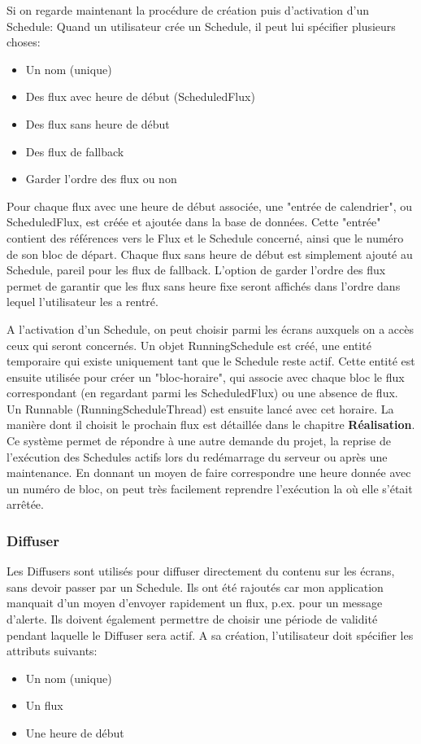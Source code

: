 \documentclass[french]{article}
\begin{document}
Si on regarde maintenant la procédure de création puis d'activation d'un Schedule:
Quand un utilisateur crée un Schedule, il peut lui spécifier plusieurs choses:
\begin{itemize}
	\item Un nom (unique)
	\item Des flux avec heure de début (ScheduledFlux)
	\item Des flux sans heure de début 
	\item Des flux de fallback
	\item Garder l'ordre des flux ou non
\end{itemize}

Pour chaque flux avec une heure de début associée, une "entrée de calendrier", ou ScheduledFlux, est créée et ajoutée dans la base de données. Cette "entrée" contient des références vers le Flux et le Schedule concerné, ainsi que le numéro de son bloc de départ.\newline
Chaque flux sans heure de début est simplement ajouté au Schedule, pareil pour les flux de fallback. L'option de garder l'ordre des flux permet de garantir que les flux sans heure fixe seront affichés dans l'ordre dans lequel l'utilisateur les a rentré. \newline

A l'activation d'un Schedule, on peut choisir parmi les écrans auxquels on a accès ceux qui seront concernés. Un objet RunningSchedule est créé, une entité temporaire qui existe uniquement tant que le Schedule reste actif. 
Cette entité est ensuite utilisée pour créer un "bloc-horaire", qui associe avec chaque bloc le flux correspondant (en regardant parmi les ScheduledFlux) ou une absence de flux. Un Runnable (RunningScheduleThread) est ensuite lancé avec cet horaire. La manière dont il choisit le prochain flux est détaillée dans le chapitre \textbf{Réalisation}.\newline 
Ce système permet de répondre à une autre demande du projet, la reprise de l'exécution des Schedules actifs lors du redémarrage du serveur ou après une maintenance. En donnant un moyen de faire correspondre une heure donnée avec un numéro de bloc, on peut très facilement reprendre l'exécution la où elle s'était arrêtée.


\subsubsection{Diffuser}
Les Diffusers sont utilisés pour diffuser directement du contenu sur les écrans, sans devoir passer par un Schedule. Ils ont été rajoutés car mon application manquait d'un moyen d'envoyer rapidement un flux, p.ex. pour un message d'alerte. Ils doivent également permettre de choisir une période de validité pendant laquelle le Diffuser sera actif. \newline
A sa création, l'utilisateur doit spécifier les attributs suivants:
\begin{itemize}
	\item Un nom (unique)
	\item Un flux
	\item Une heure de début
\end{itemize}
\end{document}
